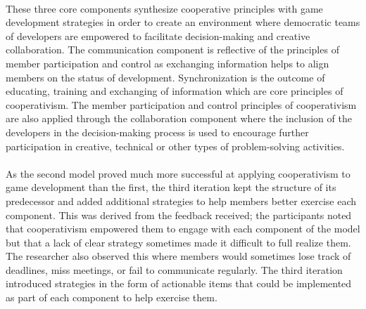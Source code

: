 \paragraph{} These three core components synthesize cooperative principles with game development strategies in order to create an environment where democratic teams of developers are empowered to facilitate decision-making and creative collaboration. The communication component is reflective of the principles of member participation and control as exchanging information helps to align members on the status of development. Synchronization is the outcome of educating, training and exchanging of information which are core principles of cooperativism. The member participation and control principles of cooperativism are also applied through the collaboration component where the inclusion of the developers in the decision-making process is used to encourage further participation in creative, technical or other types of problem-solving activities.

\paragraph{} As the second model proved much more successful at applying cooperativism to game development than the first, the third iteration kept the structure of its predecessor and added additional strategies to help members better exercise each component. This was derived from the feedback received; the participants noted that cooperativism empowered them to engage with each component of the model but that a lack of clear strategy sometimes made it difficult to full realize them. The researcher also observed this where members would sometimes lose track of deadlines, miss meetings, or fail to communicate regularly. The third iteration introduced strategies in the form of actionable items that could be implemented as part of each component to help exercise them.